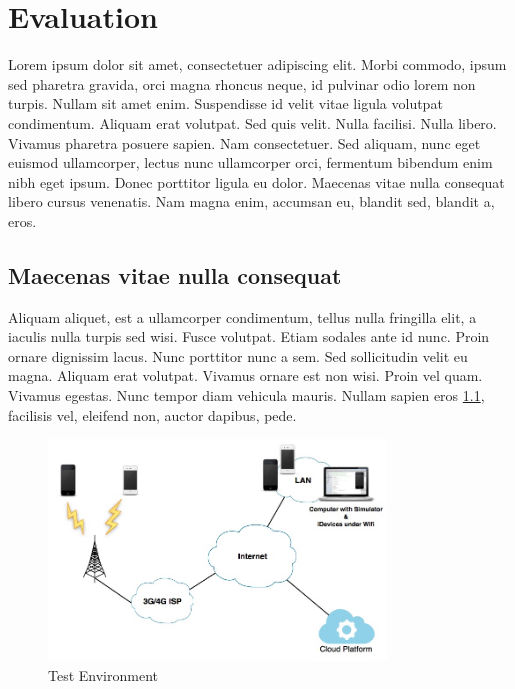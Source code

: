 \chapter{Evaluation}
\chaptoc
\label{chap:evaluation}

Lorem ipsum dolor sit amet, consectetuer adipiscing elit. Morbi commodo, ipsum sed pharetra gravida, orci magna rhoncus neque, id pulvinar odio lorem non turpis. Nullam sit amet enim. Suspendisse id velit vitae ligula volutpat condimentum. Aliquam erat volutpat. Sed quis velit. Nulla facilisi. Nulla libero. Vivamus pharetra posuere sapien. Nam consectetuer. Sed aliquam, nunc eget euismod ullamcorper, lectus nunc ullamcorper orci, fermentum bibendum enim nibh eget ipsum. Donec porttitor ligula eu dolor. Maecenas vitae nulla consequat libero cursus venenatis. Nam magna enim, accumsan eu, blandit sed, blandit a, eros. 
\section{Maecenas vitae nulla consequat} 
Aliquam aliquet, est a ullamcorper condimentum, tellus nulla fringilla elit, a iaculis nulla turpis sed wisi. Fusce volutpat. Etiam sodales ante id nunc. Proin ornare dignissim lacus. Nunc porttitor nunc a sem. Sed sollicitudin velit eu magna. Aliquam erat volutpat. Vivamus ornare est non wisi. Proin vel quam. Vivamus egestas. Nunc tempor diam vehicula mauris. Nullam sapien eros \ref{fig:test_env}, facilisis vel, eleifend non, auctor dapibus, pede.

\begin{figure}[h]
\centering
\includegraphics[width=0.8\textwidth]{./Images/test_env}
\caption{Test Environment}
\label{fig:test_env}
\end{figure}

